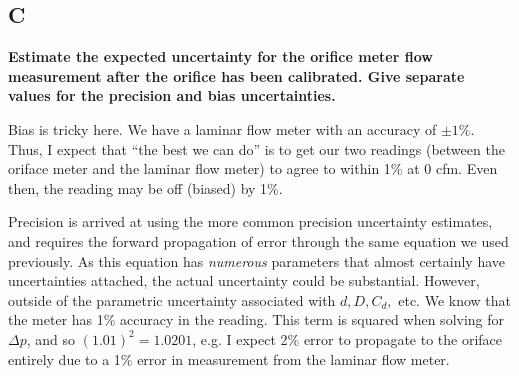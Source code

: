 \documentclass{article}
\begin{document}
\subsection*{C}
\textbf{Estimate the expected uncertainty for the orifice meter flow
measurement after the orifice has been calibrated. Give separate values
for the precision and bias uncertainties.} 

Bias is tricky here. We have a laminar flow meter with an accuracy of
$\pm 1\%$. Thus, I expect that ``the best we can do'' is to get our two
readings (between the oriface meter and the laminar flow meter) to agree
to within 1\% at 0 cfm. Even then, the reading may be off (biased) by
1\%. 

Precision is arrived at using the more common precision uncertainty
estimates, and requires the forward propagation of error through the
same equation we used previously. As this equation has \emph{numerous}
parameters that almost certainly have uncertainties attached, the actual
uncertainty could be substantial. However, outside of the parametric
uncertainty associated with $d,D,C_d,$ etc. We know that the meter has
1\% accuracy in the reading. This term is squared when solving for
$\Delta p$, and so $(1.01)^2 = 1.0201 $, e.g. I expect 2\% error
to propagate to the oriface entirely due to a 1\% error in measurement
from the laminar flow meter. 
\end{document}
